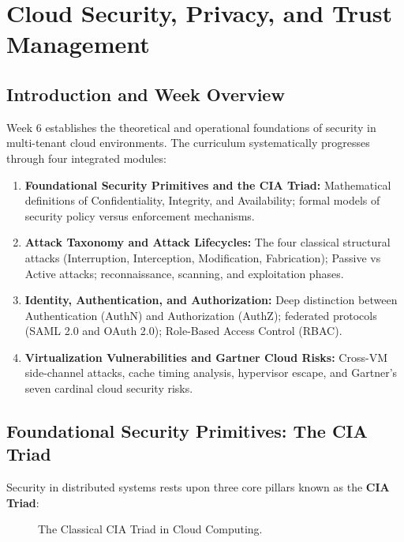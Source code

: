 \chapter{Cloud Security, Privacy, and Trust Management}

\section{Introduction and Week Overview}
Week 6 establishes the theoretical and operational foundations of security in multi-tenant cloud environments. The curriculum systematically progresses through four integrated modules:
\begin{enumerate}[leftmargin=*]
  \item \textbf{Foundational Security Primitives and the CIA Triad:} Mathematical definitions of Confidentiality, Integrity, and Availability; formal models of security policy versus enforcement mechanisms.
  \item \textbf{Attack Taxonomy and Attack Lifecycles:} The four classical structural attacks (Interruption, Interception, Modification, Fabrication); Passive vs Active attacks; reconnaissance, scanning, and exploitation phases.
  \item \textbf{Identity, Authentication, and Authorization:} Deep distinction between Authentication (AuthN) and Authorization (AuthZ); federated protocols (SAML 2.0 and OAuth 2.0); Role-Based Access Control (RBAC).
  \item \textbf{Virtualization Vulnerabilities and Gartner Cloud Risks:} Cross-VM side-channel attacks, cache timing analysis, hypervisor escape, and Gartner's seven cardinal cloud security risks.
\end{enumerate}

\section{Foundational Security Primitives: The CIA Triad}
Security in distributed systems rests upon three core pillars known as the \textbf{CIA Triad}:
\begin{figure}[H]
\centering
{}
\caption{The Classical CIA Triad in Cloud Computing.}
\end{figure}

